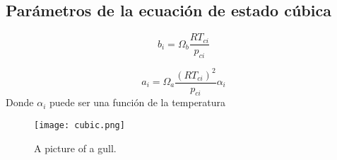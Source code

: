 \subsection{Parámetros de la ecuación de estado cúbica}

\begin{equation}
	b_i = \Omega_b \frac{R T_{ci}}{p_{ci}} 
\end{equation}

\begin{equation}
 a_i = \Omega_a \frac{\left(R T_{ci}\right)^2}{p_{ci}} \alpha_i
\end{equation}
Donde $\alpha_i$ puede ser una función de la temperatura





\begin{figure}[!h]
  
  \centering
    \texttt{[image: cubic.png]}
    \caption{A picture of a gull.}
\end{figure}


